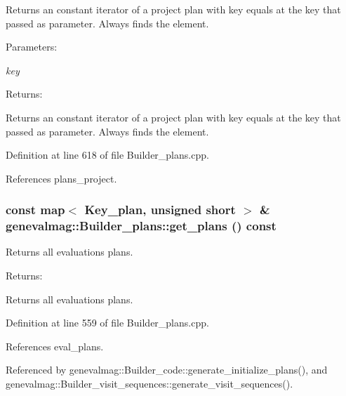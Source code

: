 Returns an constant iterator of a project plan with key equals at the key that passed as parameter. Always finds the element. \begin{Desc}
\item[Parameters:]
\begin{description}
\item[{\em key}]\end{description}
\end{Desc}
\begin{Desc}
\item[Returns:]\end{Desc}
Returns an constant iterator of a project plan with key equals at the key that passed as parameter. Always finds the element. 

Definition at line 618 of file Builder\_\-plans.cpp.

References plans\_\-project.\hypertarget{classgenevalmag_1_1Builder__plans_75890521873bd1f8bee15799d820d755}{
\subsubsection[{get\_\-plans}]{\setlength{\rightskip}{0pt plus 5cm}const map$<$ {\bf Key\_\-plan}, unsigned short $>$ \& genevalmag::Builder\_\-plans::get\_\-plans () const}}
\label{classgenevalmag_1_1Builder__plans_75890521873bd1f8bee15799d820d755}


Returns all evaluations plans. \begin{Desc}
\item[Returns:]\end{Desc}
Returns all evaluations plans. 

Definition at line 559 of file Builder\_\-plans.cpp.

References eval\_\-plans.

Referenced by genevalmag::Builder\_\-code::generate\_\-initialize\_\-plans(), and genevalmag::Builder\_\-visit\_\-sequences::generate\_\-visit\_\-sequences().

